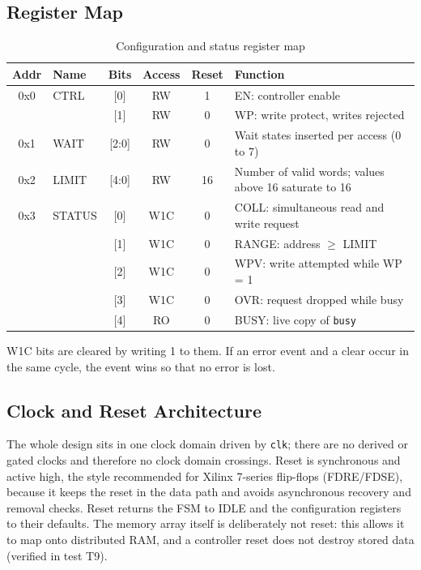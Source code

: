 \documentclass[11pt,a4paper]{article}
\newcommand{\sig}[1]{\texttt{#1}}
\begin{document}
\subsection{Register Map}
\begin{table}[H]
\centering
\caption{Configuration and status register map}
\label{tab:regmap}
\small
\begin{tabularx}{\textwidth}{@{}c l c c c X@{}}
\toprule
\textbf{Addr} & \textbf{Name} & \textbf{Bits} & \textbf{Access} & \textbf{Reset} & \textbf{Function} \\
\midrule
0x0 & CTRL & [0] & RW & 1 & EN: controller enable \\
    &      & [1] & RW & 0 & WP: write protect, writes rejected \\
0x1 & WAIT & [2:0] & RW & 0 & Wait states inserted per access (0 to 7) \\
0x2 & LIMIT & [4:0] & RW & 16 & Number of valid words; values above 16 saturate to 16 \\
0x3 & STATUS & [0] & W1C & 0 & COLL: simultaneous read and write request \\
    &        & [1] & W1C & 0 & RANGE: address $\geq$ LIMIT \\
    &        & [2] & W1C & 0 & WPV: write attempted while WP = 1 \\
    &        & [3] & W1C & 0 & OVR: request dropped while busy \\
    &        & [4] & RO  & 0 & BUSY: live copy of \sig{busy} \\
\bottomrule
\end{tabularx}
\end{table}
W1C bits are cleared by writing 1 to them. If an error event and a clear occur in the same cycle, the event wins so that no error is lost.

\subsection{Clock and Reset Architecture}
The whole design sits in one clock domain driven by \sig{clk}; there are no derived or gated clocks and therefore no clock domain crossings. Reset is synchronous and active high, the style recommended for Xilinx 7-series flip-flops (FDRE/FDSE), because it keeps the reset in the data path and avoids asynchronous recovery and removal checks. Reset returns the FSM to IDLE and the configuration registers to their defaults. The memory array itself is deliberately not reset: this allows it to map onto distributed RAM, and a controller reset does not destroy stored data (verified in test T9).
\end{document}

